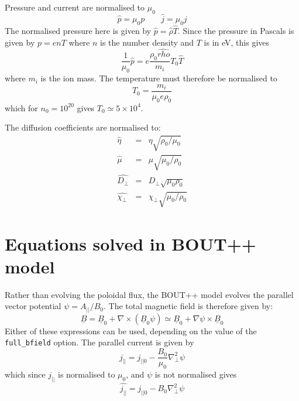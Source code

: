 \documentclass[12pt]{article}
\newcommand{\Bvec}{\ensuremath{\underline{B}}}
\begin{document}
Pressure and current are normalised to $\mu_0$
\[
\hat{p} = \mu_0 p \qquad \hat{j} = \mu_0 j
\]
The normalised pressure here is given by $\hat{p} = \hat{\rho}\hat{T}$.
Since the pressure in Pascals is given by $p = enT$ where $n$ is the number
density and $T$ is in eV, this gives
\[
\frac{1}{\mu_0}\hat{p} = e\frac{\rho_0\hat{rho}}{m_i} T_0\hat{T}
\]
where $m_i$ is the ion mass. The temperature must therefore be normalised to
\[
T_0 = \frac{m_i}{\mu_0 e \rho_0}
\]
which for $n_0=10^{20}$ gives $T_0\simeq 5\times 10^4$.

The diffusion coefficients are normalised to:
\begin{eqnarray*}
\hat{\eta} &=& \eta\sqrt{\rho_0 / \mu_0} \\
\hat{\mu} &=& \mu\sqrt{\mu_0/\rho_0} \\
\hat{D_\perp} &=& D_\perp\sqrt{\mu_0\rho_0} \\
\hat{\chi_\perp} &=& \chi_\perp\sqrt{\mu_0/\rho_0}
\end{eqnarray*}

\section{Equations solved in BOUT++ model}

Rather than evolving the poloidal flux, the BOUT++ model evolves
the parallel vector potential $\psi = A_{||} / B_0$. The total magnetic field
is therefore given by:
\[
\Bvec = \Bvec_0 + \nabla\times\left(\Bvec_0\psi\right) \simeq \Bvec_0 + \nabla\psi \times\Bvec_0
\]
Either of these expressions can be used, depending on the value of the \texttt{full\_bfield} option. The parallel current is given by
\[
j_{||} = j_{||0} - \frac{B_0}{\mu_0}\nabla_\perp^2\psi
\]
which since $j_{||}$ is normalised to $\mu_0$, and $\psi$ is not normalised gives
\[
\hat{j_{||}} = \hat{j_{||0}} - B_0\nabla_\perp^2\psi
\]
\end{document}
